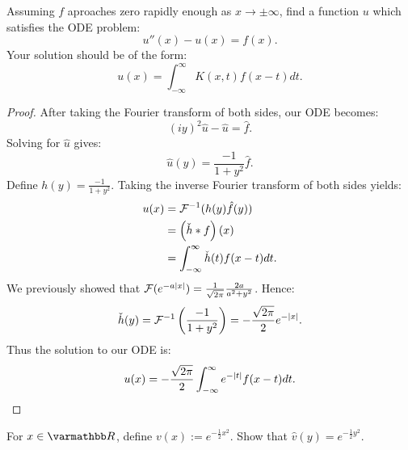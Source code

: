 \documentclass[10pt,oneside,openany]{memoir}
\begin{document}
\begin{problem}
	Assuming $f$ aproaches zero rapidly enough as $x \rightarrow \pm \infty$, find a function $u$ which satisfies the ODE problem:
	\[
		u''(x) - u(x) = f(x).
	\] 
	Your solution should be of the form:
	\[
		 u(x) = \int_{-\infty}^{\infty} K(x,t)f(x-t)dt.
	\] 
\end{problem}
	\begin{proof}
		After taking the Fourier transform of both sides, our ODE becomes:
		\[
			(iy)^2 \hat{u} - \hat{u} = \hat{f}.
		\]
		Solving for $\hat{u}$ gives:
		\[
			\hat{u}(y) = \frac{-1}{1+y^2}\hat{f}.
		\] 
		Define $h(y) = \frac{-1}{1+y^2}$. Taking the inverse Fourier transform of both sides yields:
		\begin{align*}
			u(x)
			&= \mathcal{F}^{-1}(h(y)\hat{f}(y))\\
			&= \left( \check{h} \ast f \right)(x) \\
			&= \int_{-\infty}^{\infty} \check{h}(t) f(x-t) dt.
		\end{align*}
		We previously showed that $\mathcal{F}(e^{-a|x|}) = \frac{1}{\sqrt{2\pi}}\frac{2a}{a^2 + y^2}$. Hence:
		\begin{align*}
			\check{h}(y) = \mathcal{F}^{-1}\left(\frac{-1}{1 + y^2}\right) = -\frac{\sqrt{2\pi}}{2} e^{-|x|}.
		\end{align*}
		Thus the solution to our ODE is:
		\[
			u(x) = -\frac{\sqrt{2\pi}}{2}\int_{-\infty}^{\infty} e^{-|t|}f(x-t)dt. \qedhere
		\] 
	\end{proof}
\newpage
\begin{problem}
	For $x \in \bfR$, define $v(x) := e^{-\frac{1}{2}x^2}$. Show that $\hat{v}(y) = e^{-\frac{1}{2}y^2}$.
\end{problem}
\newpage
\end{document}
